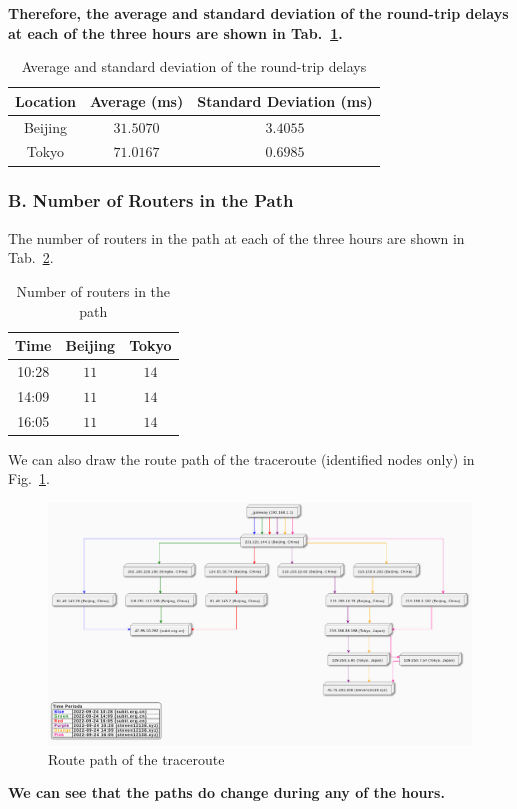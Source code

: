 \documentclass{cshwk}
\begin{document}
\textbf{Therefore, the average and standard deviation of the round-trip delays at each of the three hours are shown in Tab.~\ref{tab:delay_result}.}
\begin{table}[H]
    \centering
    \begin{tabular}{ccc}
        \hline
        Location & Average (ms) & Standard Deviation (ms) \\
        \hline
        Beijing  & $31.5070$    & $3.4055$                \\
        Tokyo    & $71.0167$    & $0.6985$                \\
        \hline
    \end{tabular}
    \caption{Average and standard deviation of the round-trip delays}
    \label{tab:delay_result}
\end{table}

\subsubsection*{B. Number of Routers in the Path}
The number of routers in the path at each of the three hours are shown in Tab.~\ref{tab:routers}.
\begin{table}[H]
    \centering
    \begin{tabular}{ccc}
        \hline
        Time  & Beijing & Tokyo \\
        \hline
        10:28 & $11$    & $14$  \\
        14:09 & $11$    & $14$  \\
        16:05 & $11$    & $14$  \\
        \hline
    \end{tabular}
    \caption{Number of routers in the path}
    \label{tab:routers}
\end{table}
We can also draw the route path of the traceroute (identified nodes only) in Fig.~\ref{fig:route}.
\begin{figure}[htbp]
    \centering
    \includegraphics[width=1\textwidth]{./hw1-3-1.pdf}
    \caption{Route path of the traceroute}
    \label{fig:route}
\end{figure}
\textbf{We can see that the paths do change during any of the hours.}
\end{document}
